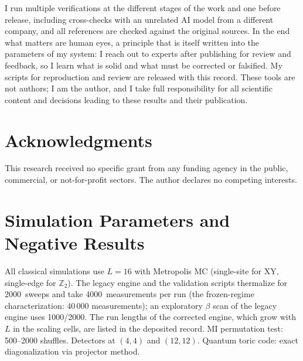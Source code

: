 \documentclass[aps,pra,twocolumn,superscriptaddress,showpacs,floatfix]{revtex4-2}
\newcommand{\Ztwo}{\mathbb{Z}_2}
\begin{document}
I run multiple verifications at the different stages of the work and one before release, including cross-checks with an unrelated AI model from a different company, and all references are checked against the original sources. In the end what matters are human eyes, a principle that is itself written into the parameters of my system: I reach out to experts after publishing for review and feedback, so I learn what is solid and what must be corrected or falsified. My scripts for reproduction and review are released with this record. These tools are not authors; I am the author, and I take full responsibility for all scientific content and decisions leading to these results and their publication.

\section*{Acknowledgments}
This research received no specific grant from any funding agency in the public,
commercial, or not-for-profit sectors. The author declares no competing
interests.

\clearpage
\onecolumngrid

\appendix
\section{Simulation Parameters and Negative Results}

All classical simulations use $L = 16$ with Metropolis MC (single-site for XY,
single-edge for $\Ztwo$). The legacy engine and the validation scripts thermalize for 2000~sweeps and take 4000~measurements per run (the frozen-regime characterization: 40\,000 measurements); an exploratory $\beta$ scan of the legacy engine uses 1000/2000. The run lengths of the corrected engine, which grow with $L$ in the scaling cells, are listed in the deposited record.
MI permutation test: 500--2000 shuffles. Detectors at $(4,4)$ and $(12,12)$.
Quantum toric code: exact diagonalization via projector method.
\end{document}
